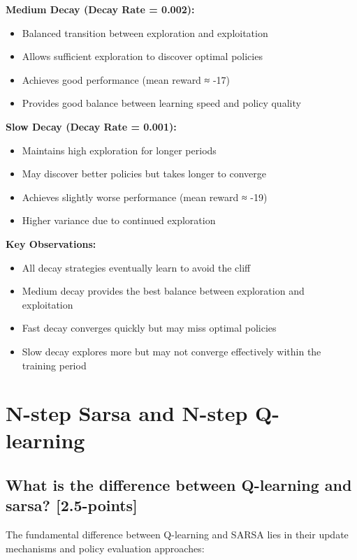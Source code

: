 \documentclass[12pt]{article}
\begin{document}
{{{\textbf{Medium Decay (Decay Rate = 0.002):}
\begin{itemize}
    \item Balanced transition between exploration and exploitation
    \item Allows sufficient exploration to discover optimal policies
    \item Achieves good performance (mean reward ≈ -17)
    \item Provides good balance between learning speed and policy quality
\end{itemize}

\textbf{Slow Decay (Decay Rate = 0.001):}
\begin{itemize}
    \item Maintains high exploration for longer periods
    \item May discover better policies but takes longer to converge
    \item Achieves slightly worse performance (mean reward ≈ -19)
    \item Higher variance due to continued exploration
\end{itemize}

\textbf{Key Observations:}
\begin{itemize}
    \item All decay strategies eventually learn to avoid the cliff
    \item Medium decay provides the best balance between exploration and exploitation
    \item Fast decay converges quickly but may miss optimal policies
    \item Slow decay explores more but may not converge effectively within the training period
\end{itemize}

\section{N-step Sarsa and N-step Q-learning}
\subsection{What is the difference between Q-learning and sarsa? [2.5-points]}

The fundamental difference between Q-learning and SARSA lies in their update mechanisms and policy evaluation approaches:

}}}
\end{document}
